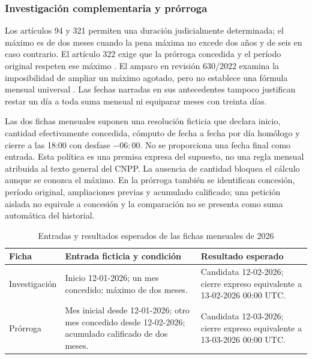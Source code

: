 \subsubsection{Investigación complementaria y prórroga}

Los artículos 94 y 321 permiten una duración judicialmente determinada; el máximo es de dos meses cuando la pena máxima no excede dos años y de seis en caso contrario. El artículo 322 exige que la prórroga concedida y el período original respeten ese máximo \cite[arts.~94, 321--322]{cnpp_consolidado2025}. El amparo en revisión 630/2022 examina la imposibilidad de ampliar un máximo agotado, pero no establece una fórmula mensual universal \cite[párrs.~37--42 y 50--51]{scjn_ar630_2022}. Las fechas narradas en sus antecedentes tampoco justifican restar un día a toda suma mensual ni equiparar meses con treinta días.

Las dos fichas mensuales suponen una resolución ficticia que declara inicio, cantidad efectivamente concedida, cómputo de fecha a fecha por día homólogo y cierre a las 18:00 con desfase $-06{:}00$. No se proporciona una fecha final como entrada. Esta política es una premisa expresa del supuesto, no una regla mensual atribuida al texto general del CNPP. La ausencia de cantidad bloquea el cálculo aunque se conozca el máximo. En la prórroga también se identifican concesión, período original, ampliaciones previas y acumulado calificado; una petición aislada no equivale a concesión y la comparación no se presenta como suma automática del historial.

\begin{table}[htbp]
  \centering
  
  \caption{Entradas y resultados esperados de las fichas mensuales de 2026}
  \label{tab:corpus-mensual}
  \begin{tabularx}{\linewidth}{@{}L{2.5cm} X X@{}}
    \toprule
    Ficha & Entrada ficticia y condición & Resultado esperado \\
    \midrule
    Investigación & Inicio 12-01-2026; un mes concedido; máximo de dos meses. & Candidata 12-02-2026; cierre expreso equivalente a 13-02-2026 00:00 UTC. \\
    \addlinespace
    Prórroga & Mes inicial desde 12-01-2026; otro mes concedido desde 12-02-2026; acumulado calificado de dos meses. & Candidata 12-03-2026; cierre expreso equivalente a 13-03-2026 00:00 UTC. \\
    \bottomrule
  \end{tabularx}
\end{table}

